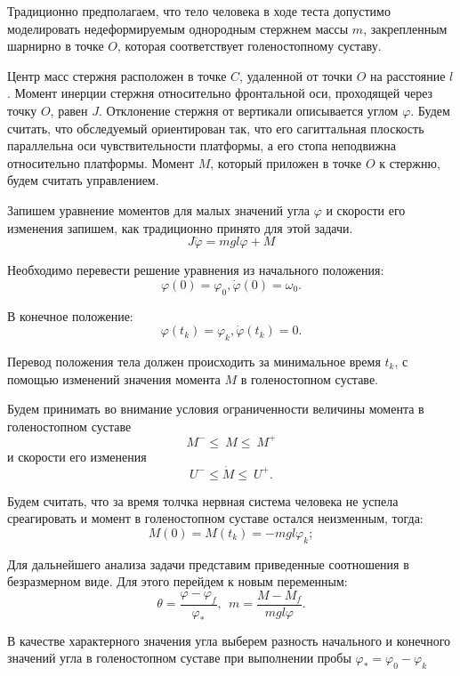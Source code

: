 \documentclass[a4paper,12pt]{article}
\theoremstyle{plain} %
\theoremstyle{definition} %
\theoremstyle{remark} %
\begin{document}
{Традиционно предполагаем, что тело человека в ходе теста допустимо
моделировать недеформируемым однородным стержнем массы $m$,
закрепленным шарнирно в точке $O$, которая соответствует
голеностопному суставу.

Центр масс стержня расположен в точке $C$, удаленной от точки $O$
на расстояние $l$. Момент инерции стержня относительно фронтальной
оси, проходящей через точку $O$, равен $J$. Отклонение стержня от
вертикали описывается углом $\varphi$. Будем считать, что обследуемый
ориентирован так, что его сагиттальная плоскость параллельна оси
чувствительности платформы, а его стопа неподвижна относительно
платформы. Момент $M$, который приложен в точке $O$ к стержню,
будем считать управлением.

Запишем уравнение моментов для малых значений угла $\varphi$ и
скорости его изменения запишем, как традиционно принято для этой задачи.
\begin{equation}\label{6}
    J\ddot{\varphi}= mgl\varphi+M
\end{equation}

Необходимо перевести решение уравнения из начального положения:
\begin{equation}\label{7}
    \varphi(0)=\varphi_0,\dot{\varphi}(0)=\omega_0.
\end{equation}

В конечное положение:
\begin{equation}\label{8}
    \varphi(t_k)=\varphi_k,\dot{\varphi}(t_k)=0.
\end{equation}

Перевод положения тела должен происходить за минимальное
время $t_k$, с помощью изменений значения момента $M$ в
голеностопном суставе.

Будем принимать во внимание условия ограниченности величины
момента в голеностопном суставе
\[
    M^-\le\ M\le\ M^+
\]
и скорости его изменения
\[
    U^-\le\dot{M}\le\ U^+.
\]

Будем считать, что за время толчка нервная система человека
не успела среагировать и момент в голеностопном суставе остался
неизменным, тогда:
\[
    M(0)=M\left(t_k\right)=-mgl\varphi_k;
\]

Для дальнейшего анализа задачи представим приведенные
соотношения в безразмерном виде. Для этого перейдем
к новым переменным:
\[
    \theta=\frac{\varphi-\varphi_f}{\varphi_\ast},\ \ m=\frac{M-M_f}{mgl\varphi}.
\]

В качестве характерного значения угла выберем разность
начального и конечного значений угла в голеностопном
суставе при выполнении пробы $\varphi_\ast=\varphi_0-\varphi_k$

}
\end{document}
